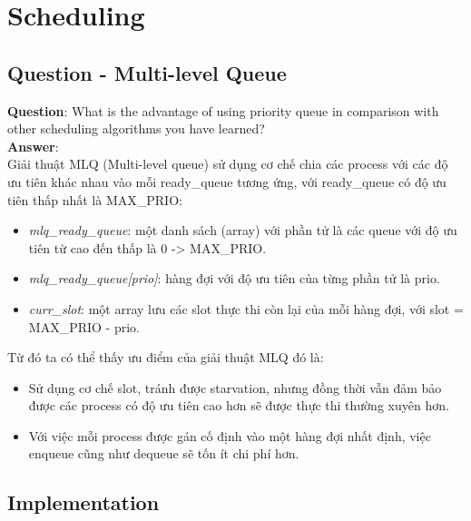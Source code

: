 \documentclass[10pt]{article}
\newcommand\tab[1][1cm]{\hspace*{#1}}
\begin{document}
\section{Scheduling}
\subsection{Question - Multi-level Queue}
\textbf{Question}: What is the advantage of using priority queue in comparison with other scheduling algorithms you have learned? \\
\textbf{Answer}:\\
\tab[0.5cm] Giải thuật MLQ (Multi-level queue) sử dụng cơ chế chia các process với các độ ưu tiên khác nhau vào mỗi ready\_queue tương ứng, với ready\_queue có độ ưu tiên thấp nhất là MAX\_PRIO:
\begin{itemize}
    \item \textit{mlq\_ready\_queue}: một danh sách (array) với phần tử là các queue với độ ưu tiên từ cao đến thấp là 0 -> MAX\_PRIO.
    \item \textit{mlq\_ready\_queue[prio]}: hàng đợi với độ ưu tiên của từng phần tử là prio.
    \item \textit{curr\_slot}: một array lưu các slot thực thi còn lại của mỗi hàng đợi, với slot = MAX\_PRIO - prio.
\end{itemize}
\tab[0.5cm] Từ đó ta có thể thấy ưu điểm của giải thuật MLQ đó là:
\begin{itemize}
    \item Sử dụng cơ chế slot, tránh được starvation, nhưng đồng thời vẫn đảm bảo được các process có độ ưu tiên cao hơn sẽ được thực thi thường xuyên hơn.
    \item Với việc mỗi process được gán cố định vào một hàng đợi nhất định, việc enqueue cũng như dequeue sẽ tốn ít chi phí hơn.
\end{itemize}

\subsection{Implementation}
\end{document}
